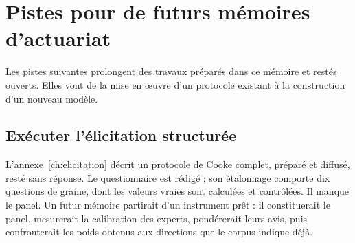 %
%
%

\chapter{Pistes pour de futurs mémoires d'actuariat}
\label{ann:pistes}

Les pistes suivantes prolongent des travaux préparés dans ce mémoire et restés ouverts.
Elles vont de la mise en œuvre d'un protocole existant à la construction d'un nouveau modèle.

\section{Exécuter l'élicitation structurée}

L'annexe~\ref{ch:elicitation} décrit un protocole de Cooke complet, préparé et diffusé, resté sans
réponse. Le questionnaire est rédigé ; son étalonnage comporte dix questions de graine, dont les
valeurs vraies sont calculées et contrôlées. Il manque le panel. Un futur mémoire partirait d'un
instrument prêt : il constituerait le panel, mesurerait la calibration des experts, pondérerait leurs
avis, puis confronterait les poids obtenus aux directions que le corpus indique déjà.

